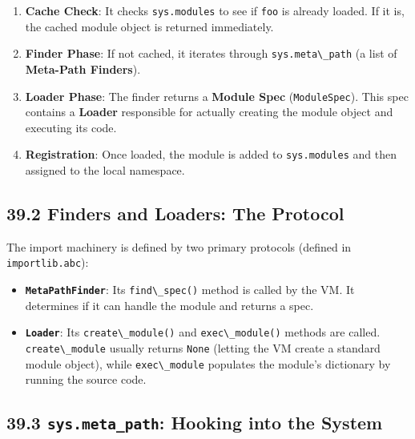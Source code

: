 \begin{enumerate}
\def\labelenumi{\arabic{enumi}.}
\tightlist
\item
  \textbf{Cache Check}: It checks \passthrough{\lstinline!sys.modules!}
  to see if \passthrough{\lstinline!foo!} is already loaded. If it is,
  the cached module object is returned immediately.
\item
  \textbf{Finder Phase}: If not cached, it iterates through
  \passthrough{\lstinline!sys.meta\_path!} (a list of \textbf{Meta-Path
  Finders}).
\item
  \textbf{Loader Phase}: The finder returns a \textbf{Module Spec}
  (\passthrough{\lstinline!ModuleSpec!}). This spec contains a
  \textbf{Loader} responsible for actually creating the module object
  and executing its code.
\item
  \textbf{Registration}: Once loaded, the module is added to
  \passthrough{\lstinline!sys.modules!} and then assigned to the local
  namespace.
\end{enumerate}

\hypertarget{finders-and-loaders-the-protocol}{%
\subsection{39.2 Finders and Loaders: The
Protocol}\label{finders-and-loaders-the-protocol}}

The import machinery is defined by two primary protocols (defined in
\passthrough{\lstinline!importlib.abc!}):

\begin{itemize}
\tightlist
\item
  \textbf{\passthrough{\lstinline!MetaPathFinder!}}: Its
  \passthrough{\lstinline!find\_spec()!} method is called by the VM. It
  determines if it can handle the module and returns a spec.
\item
  \textbf{\passthrough{\lstinline!Loader!}}: Its
  \passthrough{\lstinline!create\_module()!} and
  \passthrough{\lstinline!exec\_module()!} methods are called.
  \passthrough{\lstinline!create\_module!} usually returns
  \passthrough{\lstinline!None!} (letting the VM create a standard
  module object), while \passthrough{\lstinline!exec\_module!} populates
  the module's dictionary by running the source code.
\end{itemize}

\hypertarget{sys.meta_path-hooking-into-the-system}{%
\subsection{\texorpdfstring{39.3 \texttt{sys.meta\_path}: Hooking into
the
System}{39.3 sys.meta\_path: Hooking into the System}}\label{sys.meta_path-hooking-into-the-system}}

